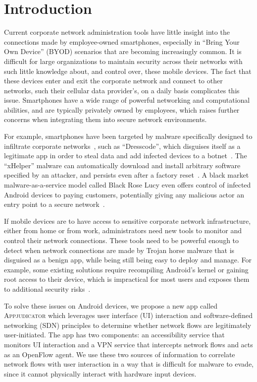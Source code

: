 \section{Introduction}
\label{sec:introduction}


Current corporate network administration tools have little insight into the
connections made by employee-owned smartphones, especially in ``Bring Your Own
Device'' (BYOD) scenarios that are becoming increasingly common. It is difficult
for large organizations to maintain security across their networks with such
little knowledge about, and control over, these mobile devices. The fact that
these devices enter and exit the corporate network and connect to other
networks, such their cellular data provider's, on a daily basis complicates this
issue. Smartphones have a wide range of powerful networking and computational
abilities, and are typically privately owned by employees, which raises further
concerns when integrating them into secure network environments.

For example, smartphones have been targeted by malware specifically designed to
infiltrate corporate networks~\cite{kan2016}, such as ``Dresscode'', which
disguises itself as a legitimate app in order to steal data and add infected
devices to a botnet~\cite{palmer2016}. The ``xHelper'' malware can automatically
download and install arbitrary software specified by an attacker, and persists
even after a factory reset~\cite{vijayan2020}. A black market
malware-as-a-service model called Black Rose Lucy even offers control of
infected Android devices to paying customers, potentially giving any malicious
actor an entry point to a secure network~\cite{wong2018}.

If mobile devices are to have access to sensitive corporate network
infrastructure, either from home or from work, administrators need new tools to
monitor and control their network connections. These tools need to be powerful
enough to detect when network connections are made by Trojan horse malware that
is disguised as a benign app, while being still being easy to deploy and manage.
For example, some existing solutions require recompiling Android's kernel or
gaining root access to their device, which is impractical for most users and
exposes them to additional security risks~\cite{google2020}.


To solve these issues on Android devices, we propose a new app called
\textsc{Appjudicator} which leverages user interface (UI) interaction and
software-defined networking (SDN) principles to determine whether network flows
are legitimately user-initiated. The app has two components: an accessibility
service that monitors UI interaction and a VPN service that intercepts network
flows and acts as an OpenFlow agent. We use these two sources of information to
correlate network flows with user interaction in a way that is difficult for
malware to evade, since it cannot physically interact with hardware input
devices.

